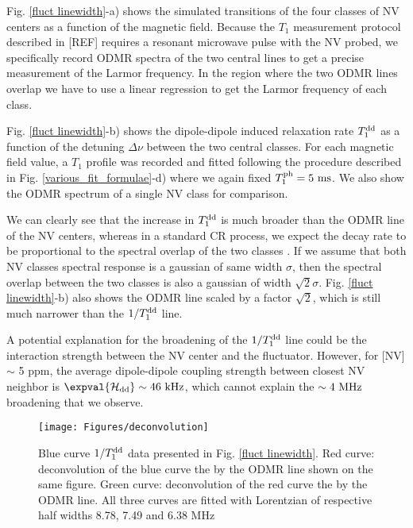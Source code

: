 \documentclass[a4paper,11pt]{report}
\begin{document}
Fig. \ref{fluct linewidth}-a) shows the simulated transitions of the four classes of NV centers as a function of the magnetic field. Because the $T_1$ measurement protocol described in [REF] requires a resonant microwave pulse with the NV probed, we specifically record ODMR spectra of the two central lines to get a precise measurement of the Larmor frequency. In the region where the two ODMR lines overlap we have to use a linear regression to get the Larmor frequency of each class.

Fig. \ref{fluct linewidth}-b) shows the dipole-dipole induced relaxation rate $T_1^{\rm dd}$ as a function of the detuning $\Delta \nu$ between the two central classes. For each magnetic field value, a $T_1$ profile was recorded and fitted following the procedure described in Fig. \ref{various_fit_formulae}-d) where we again fixed $T_1^{\rm ph}=5\ \rm ms$. We also show the ODMR spectrum of a single NV class for comparison.

We can clearly see that the increase in $T_1^{\rm dd}$ is much broader than the ODMR line of the NV centers, whereas in a standard CR process, we expect the decay rate to be proportional to the spectral overlap of the two classes \citep{hall2016detection}. If we assume that both NV classes spectral response is a gaussian of same width $\sigma$, then the spectral overlap between the two classes is also a gaussian of width $\sqrt{2} \sigma$. Fig. \ref{fluct linewidth}-b) also shows the ODMR line scaled by a factor $\sqrt{2}$, which is still much narrower than the $1/T_1^{\rm dd}$ line.

A potential explanation for the broadening of the $1/T_1^{\rm dd}$ line could be the interaction strength between the NV center and the fluctuator. However, for [NV] $\sim$ 5 ppm, the average dipole-dipole coupling strength between closest NV neighbor is $\expval{\mathcal{H}_{\rm dd}} \sim 46\ \rm kHz$, which cannot explain the $\sim 4\ \rm MHz$ broadening that we observe.

\begin{figure}[h]
\centering
\texttt{[image: Figures/deconvolution]}
\caption{Blue curve $1/T_1^{\rm dd}$ data presented in Fig. \ref{fluct linewidth}. Red curve: deconvolution of the blue curve the  by the ODMR line shown on the same figure. Green curve: deconvolution of the red curve the  by the ODMR line. All three curves are fitted with Lorentzian of respective half widths 8.78, 7.49 and 6.38 MHz}
\label{deconvolution}
\end{figure}
\end{document}
